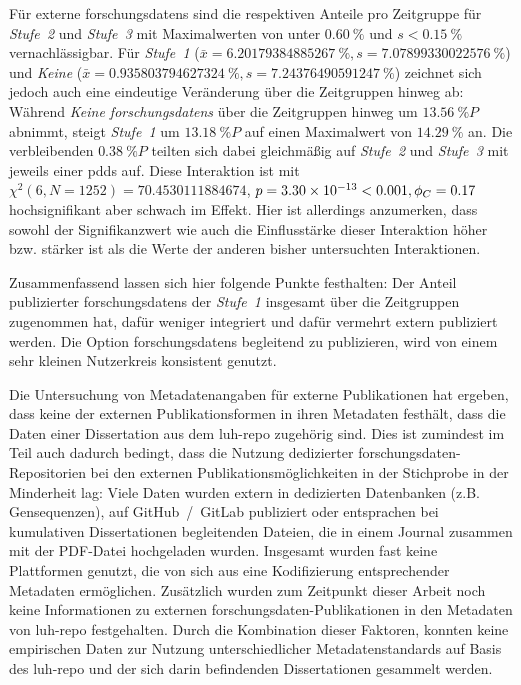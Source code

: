 Für externe \glspl{forschungsdaten} sind die respektiven Anteile pro Zeitgruppe für \textit{Stufe~2} und \textit{Stufe~3} mit Maximalwerten von unter $\SI{0,60}{\percent}$ und $s<\SI{0,15}{\percent}$ vernachlässigbar.
Für \textit{Stufe~1} ($\bar{x}=\SI[round-mode=places,round-precision=2]{6.20179384885267}{\percent},s=\SI[round-mode=places,round-precision=2]{7.07899330022576}{\percent}$) und \textit{Keine} ($\bar{x}=\SI[round-mode=places,round-precision=2]{0.935803794627324}{\percent},s=\SI[round-mode=places,round-precision=2]{7.24376490591247}{\percent}$) zeichnet sich jedoch auch eine eindeutige Veränderung über die Zeitgruppen hinweg ab:
Während \textit{Keine \glspl{forschungsdaten}} über die Zeitgruppen hinweg um $\SI[round-mode=places,round-precision=2]{13.56}{\percent P}$ abnimmt, steigt \textit{Stufe~1} um $\SI[round-mode=places,round-precision=2]{13.18}{\percent P}$ auf einen Maximalwert von $\SI[round-mode=places,round-precision=2]{14.29}{\percent}$ an.
Die verbleibenden $\SI[round-mode=places,round-precision=2]{0.38}{\percent P}$ teilten sich dabei gleichmäßig auf \textit{Stufe~2} und \textit{Stufe~3} mit jeweils einer \glspl{pdd} auf.
Diese Interaktion ist mit $\chi^2 (\num{6}, N = \num{1252}) = \num[round-mode=places,round-precision=2]{70.4530111884674}$, $p = \num[round-mode=places,round-precision=2]{3.3012369430121E-13}<\num{0.001},\phi_C=\num[round-mode=places,round-precision=2]{0.167738446925158}$ hochsignifikant aber schwach im Effekt.
Hier ist allerdings anzumerken, dass sowohl der Signifikanzwert wie auch die Einflusstärke dieser Interaktion höher bzw. stärker ist als die Werte der anderen bisher untersuchten Interaktionen.

Zusammenfassend lassen sich hier folgende Punkte festhalten:
Der Anteil publizierter \glspl{forschungsdaten} der \textit{Stufe~1} insgesamt über die Zeitgruppen zugenommen hat, dafür weniger integriert und dafür vermehrt extern publiziert werden.
Die Option \glspl{forschungsdaten} begleitend zu publizieren, wird von einem sehr kleinen Nutzerkreis konsistent genutzt.

Die Untersuchung von Metadatenangaben für externe Publikationen hat ergeben, dass keine der externen Publikationsformen in ihren Metadaten festhält, dass die Daten einer Dissertation aus dem \gls{luh-repo} zugehörig sind.
Dies ist zumindest im Teil auch dadurch bedingt, dass die Nutzung dedizierter \gls{forschungsdaten}-Repositorien bei den externen Publikationsmöglichkeiten in der Stichprobe in der Minderheit lag:
Viele Daten wurden extern in dedizierten Datenbanken (z.B. Gensequenzen), auf GitHub~/~GitLab publiziert oder entsprachen bei kumulativen Dissertationen begleitenden Dateien, die in einem Journal zusammen mit der PDF-Datei hochgeladen wurden.
Insgesamt wurden fast keine Plattformen genutzt, die von sich aus eine Kodifizierung entsprechender Metadaten ermöglichen.
Zusätzlich wurden zum Zeitpunkt dieser Arbeit noch keine Informationen zu externen \gls{forschungsdaten}-Publikationen in den Metadaten von \gls{luh-repo} festgehalten.
Durch die Kombination dieser Faktoren, konnten keine empirischen Daten zur Nutzung unterschiedlicher Metadatenstandards auf Basis des \gls{luh-repo} und der sich darin befindenden Dissertationen gesammelt werden.

